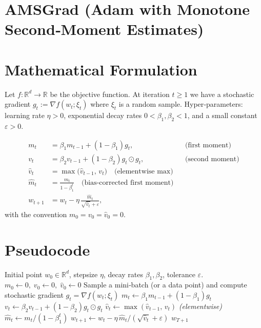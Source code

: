 \documentclass{article}
\begin{document}
\section*{AMSGrad (Adam with Monotone Second‑Moment Estimates)}

\section*{Mathematical Formulation}
Let $f:\mathbb{R}^d\rightarrow\mathbb{R}$ be the objective function.  
At iteration $t\ge 1$ we have a stochastic gradient $g_t:=\nabla f(w_t;\xi_t)$ where $\xi_t$ is a random sample.  
Hyper‑parameters: learning rate $\eta>0$, exponential decay rates $0<\beta_1,\beta_2<1$, and a small constant $\varepsilon>0$.

\[
\begin{aligned}
m_t &= \beta_1 m_{t-1} + (1-\beta_1) g_t, \qquad &&\text{(first moment)}\\[4pt]
v_t &= \beta_2 v_{t-1} + (1-\beta_2) g_t\odot g_t, \qquad &&\text{(second moment)}\\[4pt]
\hat{v}_t &= \max\!\big(\hat{v}_{t-1},\, v_t\big) \quad\text{(elementwise max)}\\[4pt]
\hat{m}_t &= \frac{m_t}{1-\beta_1^{t}}\quad\text{(bias‑corrected first moment)}\\[4pt]
w_{t+1} &= w_t - \eta\,\frac{\hat{m}_t}{\sqrt{\hat{v}_t}+\varepsilon},
\end{aligned}
\]
with the convention $m_0=v_0=\hat{v}_0=0$.

\section*{Pseudocode}
\begin{algorithm}[H]
\caption{AMSGrad}
\begin{algorithmic}[1]
\REQUIRE Initial point $w_0\in\mathbb{R}^d$, stepsize $\eta$, decay rates $\beta_1,\beta_2$, tolerance $\varepsilon$.
\STATE $m_0\gets 0,\; v_0\gets 0,\; \hat{v}_0\gets 0$
    \STATE Sample a mini‑batch (or a data point) and compute stochastic gradient $g_t=\nabla f(w_t;\xi_t)$
    \STATE $m_t \gets \beta_1 m_{t-1} + (1-\beta_1) g_t$
    \STATE $v_t \gets \beta_2 v_{t-1} + (1-\beta_2) g_t\odot g_t$
    \STATE $\hat{v}_t \gets \max(\hat{v}_{t-1},\,v_t)$ \hfill\textit{(elementwise)}
    \STATE $\hat{m}_t \gets m_t/(1-\beta_1^{t})$
    \STATE $w_{t+1} \gets w_t - \eta\,\hat{m}_t/(\sqrt{\hat{v}_t}+\varepsilon)$
\ENDFOR
\RETURN $w_{T+1}$
\end{algorithmic}
\end{algorithm}
\end{document}
